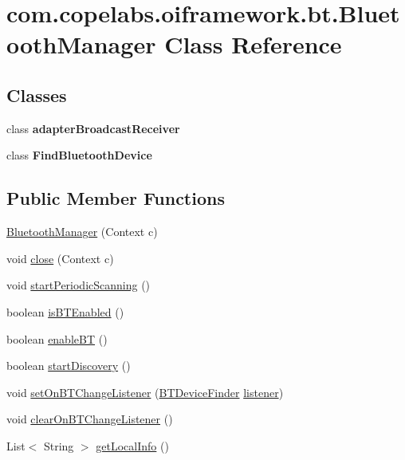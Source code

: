 \hypertarget{classcom_1_1copelabs_1_1oiframework_1_1bt_1_1_bluetooth_manager}{}\section{com.\+copelabs.\+oiframework.\+bt.\+Bluetooth\+Manager Class Reference}
\label{classcom_1_1copelabs_1_1oiframework_1_1bt_1_1_bluetooth_manager}
\subsection*{Classes}
\begin{DoxyCompactItemize}
\item 
class {\bfseries adapter\+Broadcast\+Receiver}
\item 
class {\bfseries Find\+Bluetooth\+Device}
\end{DoxyCompactItemize}
\subsection*{Public Member Functions}
\begin{DoxyCompactItemize}
\item 
\hyperlink{classcom_1_1copelabs_1_1oiframework_1_1bt_1_1_bluetooth_manager_a1604491892243d255d2d33bc6584e43c}{Bluetooth\+Manager} (Context c)
\item 
void \hyperlink{classcom_1_1copelabs_1_1oiframework_1_1bt_1_1_bluetooth_manager_a5fcff02792520c317e2c668e45d351bf}{close} (Context c)
\item 
void \hyperlink{classcom_1_1copelabs_1_1oiframework_1_1bt_1_1_bluetooth_manager_aca86c17dd214c45aa83fc565810b8c16}{start\+Periodic\+Scanning} ()
\item 
boolean \hyperlink{classcom_1_1copelabs_1_1oiframework_1_1bt_1_1_bluetooth_manager_a3530fc62498189dc89dafdfd53501b5c}{is\+B\+T\+Enabled} ()
\item 
boolean \hyperlink{classcom_1_1copelabs_1_1oiframework_1_1bt_1_1_bluetooth_manager_a7204679724ff6dcdda2c5eec56b82071}{enable\+B\+T} ()
\item 
boolean \hyperlink{classcom_1_1copelabs_1_1oiframework_1_1bt_1_1_bluetooth_manager_a7e19811703538120a5a5b053793be08c}{start\+Discovery} ()
\item 
void \hyperlink{classcom_1_1copelabs_1_1oiframework_1_1bt_1_1_bluetooth_manager_a41ed4b1446175b3fd4e99d83709a8264}{set\+On\+B\+T\+Change\+Listener} (\hyperlink{interfacecom_1_1copelabs_1_1oiframework_1_1bt_1_1_b_t_device_finder}{B\+T\+Device\+Finder} \hyperlink{classcom_1_1copelabs_1_1oiframework_1_1bt_1_1_bluetooth_manager_a1bcff176cc3849a9015a66ff51165427}{listener})
\item 
void \hyperlink{classcom_1_1copelabs_1_1oiframework_1_1bt_1_1_bluetooth_manager_a3a83b284772eec276590142456d6fca4}{clear\+On\+B\+T\+Change\+Listener} ()
\item 
List$<$ String $>$ \hyperlink{classcom_1_1copelabs_1_1oiframework_1_1bt_1_1_bluetooth_manager_aaeacf94013abb07b43b9185465509e4a}{get\+Local\+Info} ()
\end{DoxyCompactItemize}
